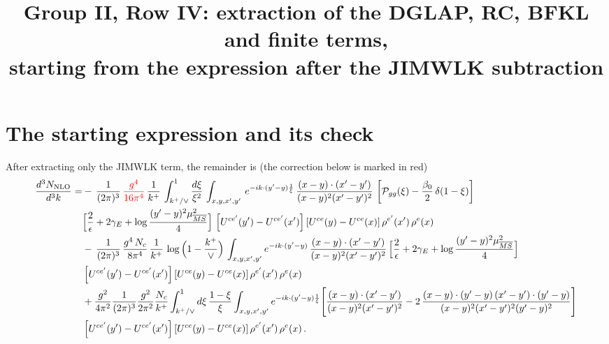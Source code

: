 \documentclass[10pt]{article}
\title{Group II, Row IV: extraction of the DGLAP, RC, BFKL and finite terms,\\ starting from the expression after the JIMWLK subtraction}
\author{}
\date{}
\newcommand{\Wbr}{\left[U^{ce'}(y') - U^{ce'}(x')\right] \left[U^{ce}(y) - U^{ce}(x)\right] \rho^{e'}(x')\, \rho^{e}(x)}
\begin{document}
\maketitle
\vspace{-2.5em}

\section{The starting expression and its check}
After extracting only the JIMWLK term, the remainder is (the correction below is marked
{\color{red}in red})
\begin{align}\label{eq:start}
\frac{d^{3}N_{\rm NLO}}{d^{3}k}=&-\,\frac{1}{(2\pi)^{3}}\,{\color{red}\frac{g^{4}}{16\pi^{4}}}\,\frac{1}{k^{+}}\,\int_{k^{+}/\vee}^{1}\frac{d\xi}{\xi^{2}}\,\int_{x,y,x',y'}\,e^{-ik\cdot(y'-y)\frac{1}{\xi}}\,\frac{(x-y)\cdot(x'-y')}{(x-y)^{2}(x'-y')^{2}}\,\left[\mathcal{P}_{gg}(\xi)-\frac{\beta_{0}}{2}\,\delta(1-\xi)\right]\notag \\ & \Big[\frac{2}{\epsilon}+2\gamma_{E}+\log\frac{(y'-y)^{2}\mu^{2}_{\overline{MS}}}{4}\Big]\,\Wbr\notag\\&
-\,\frac{1}{(2\pi)^{3}}\,\frac{g^{4}\,N_{c}}{8\pi^{4}}\,\frac{1}{k^{+}}\,\log\Big(1-\frac{k^{+}}{\vee}\Big)\,\int_{x,y,x',y'}e^{-ik\cdot(y'-y)}\,\frac{(x-y)\cdot(x'-y')}{(x-y)^{2}(x'-y')^{2}}\,\Big[\frac{2}{\epsilon}+2\gamma_{E}+\log\frac{(y'-y)^{2}\mu^{2}_{\overline{MS}}}{4}\Big]\notag \\ & \Wbr\notag\\
&+\frac{g^{2}}{4\pi^{2}}\frac{1}{(2\pi)^{3}}\frac{g^{2}}{2\pi^{2}}\frac{N_{c}}{k^{+}}\int_{k^{+}/\vee}^{1}d\xi\,\frac{1-\xi}{\xi}\int_{x,y,x',y'}e^{-ik\cdot(y'-y)\frac{1}{\xi}}\Bigg[\frac{(x-y)\cdot(x'-y')}{(x-y)^{2}(x'-y')^{2}}-2\,\frac{(x-y)\cdot(y'-y)\,(x'-y')\cdot(y'-y)}{(x-y)^{2}(x'-y')^{2}(y'-y)^{2}}\Bigg]\notag \\ & \Wbr\,.
\end{align}
\end{document}
